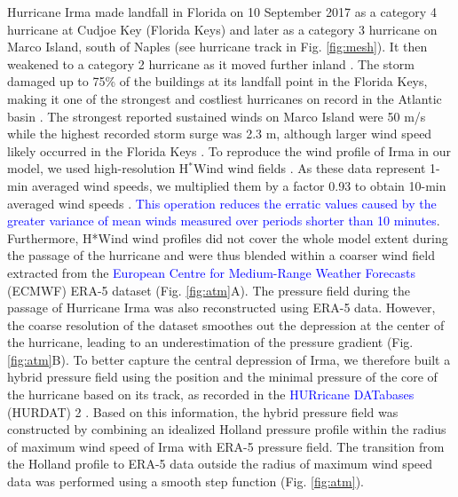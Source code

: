 \documentclass[preprint,12pt,authoryear]{elsarticle}
\newcommand{\modif}[1]{\textcolor{blue}{#1}}
\begin{document}
Hurricane Irma made landfall in Florida on 10 September 2017 as a category 4 hurricane at Cudjoe Key (Florida Keys) and later as a category 3 hurricane on Marco Island, south of Naples (see hurricane track in Fig. \ref{fig:mesh}). It then weakened to a category 2 hurricane as it moved further inland \citep{irmaNOAA}. The storm damaged up to 75\% of the buildings at its landfall point in the Florida Keys, making it one of the strongest and costliest hurricanes on record in the Atlantic basin \citep{xian2018brief,zhang2019modeling}. The strongest reported sustained winds on Marco Island were 50 m/s while the highest recorded storm surge was 2.3 m, although larger wind speed likely occurred in the Florida Keys \citep{pinelli2018overview}. To reproduce the wind profile of Irma in our model, we used high-resolution H$^\ast$Wind wind fields \citep{powell1998hrd}. As these data represent 1-min averaged wind speeds, we multiplied them by a factor 0.93 to obtain 10-min averaged wind speeds \citep{harper2010guidelines}. \modif{This operation reduces the erratic values caused by the greater variance of mean winds measured over periods shorter than 10 minutes}. Furthermore, H*Wind wind profiles did not cover the whole model extent during the passage of the hurricane and were thus blended within a coarser wind field extracted from the \modif{European Centre for Medium-Range Weather Forecasts} (ECMWF) ERA-5 dataset (Fig. \ref{fig:atm}A). The pressure field during the passage of Hurricane Irma was also reconstructed using ERA-5 data. However, the coarse resolution of the dataset smoothes out the depression at the center of the hurricane, leading to an underestimation of the pressure gradient (Fig. \ref{fig:atm}B). To better capture the central depression of Irma, we therefore built a hybrid pressure field using the position and the minimal pressure of the core of the hurricane based on its track, as recorded in the \modif{HURricane DATabases} (HURDAT) 2 \citep{landsea2013atlantic}. Based on this information, the hybrid pressure field was constructed by combining an idealized Holland pressure profile \citep{lin2012hurricane} within the radius of maximum wind speed of Irma \citep{knaff2018statistical} with ERA-5 pressure field. The transition from the Holland profile to ERA-5 data outside the radius of maximum wind speed data was performed using a smooth step function (Fig. \ref{fig:atm}).
\end{document}
